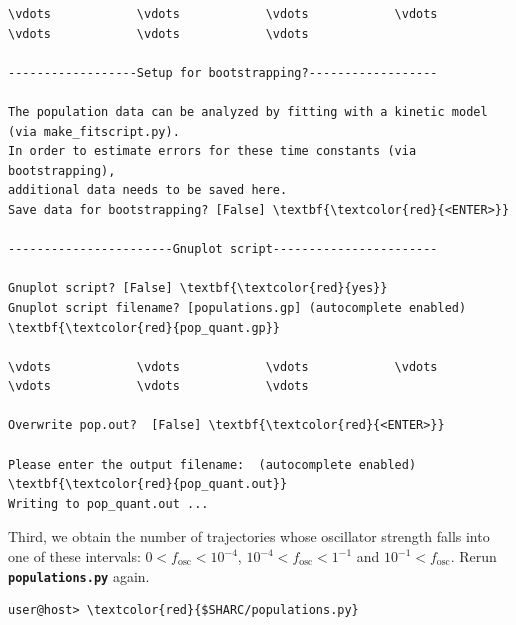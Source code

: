 \documentclass[a4paper,11pt,DIV=15,openany]{scrbook}
\newcommand{\ttt}[1]{\textbf{\texttt{#1}}}
\begin{document}
\begin{oframed}
\begin{Verbatim}[commandchars=\\\{\}]
\vdots            \vdots            \vdots            \vdots            \vdots            \vdots            \vdots            

------------------Setup for bootstrapping?------------------

The population data can be analyzed by fitting with a kinetic model (via make_fitscript.py). 
In order to estimate errors for these time constants (via bootstrapping), 
additional data needs to be saved here.
Save data for bootstrapping? [False] \textbf{\textcolor{red}{<ENTER>}}

-----------------------Gnuplot script-----------------------

Gnuplot script? [False] \textbf{\textcolor{red}{yes}}
Gnuplot script filename? [populations.gp] (autocomplete enabled) \textbf{\textcolor{red}{pop_quant.gp}}

\vdots            \vdots            \vdots            \vdots            \vdots            \vdots            \vdots            

Overwrite pop.out?  [False] \textbf{\textcolor{red}{<ENTER>}}

Please enter the output filename:  (autocomplete enabled) \textbf{\textcolor{red}{pop_quant.out}}
Writing to pop_quant.out ...
\end{Verbatim}
\end{oframed}

\normalsize
Third, we obtain the number of trajectories whose oscillator strength falls into one of these intervals: $0<f_\text{osc}<10^{-4}$, $10^{-4}<f_\text{osc}<1^{-1}$ and $10^{-1}<f_\text{osc}$. Rerun \ttt{populations.py} again.
\begin{Verbatim}[commandchars=\\\{\}]
user@host> \textcolor{red}{$SHARC/populations.py}
\end{Verbatim}
\end{document}
